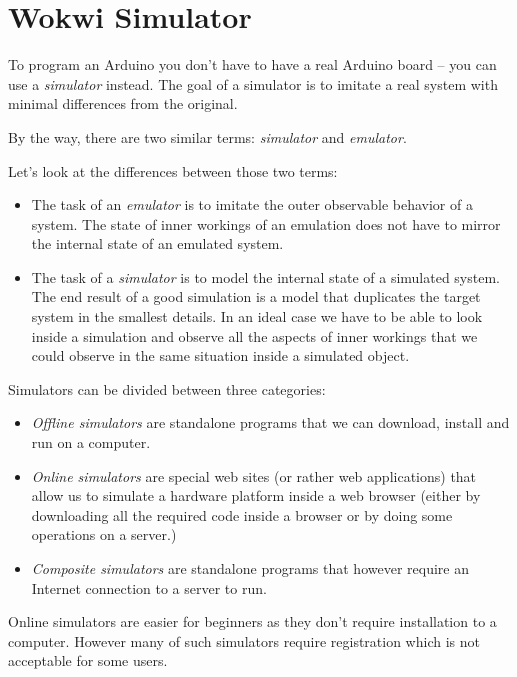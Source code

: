 \documentclass[../sparc.tex]{subfiles}
\begin{document}
\section{Wokwi Simulator}

To program an Arduino you don't have to have a real Arduino board -- you can use
a \emph{simulator} instead.  The goal of a simulator is to imitate a real system
with minimal differences from the original.

By the way, there are two similar terms: \emph{simulator} and \emph{emulator}.

Let's look at the differences\cite{so:simulator-vs-emulator} between those two
terms:

\begin{itemize}
\item The task of an \emph{emulator} is to imitate the outer observable behavior
  of a system.  The state of inner workings of an emulation does not have to
  mirror the internal state of an emulated system.
\item The task of a \emph{simulator} is to model the internal state of a
  simulated system.  The end result of a good simulation is a model that
  duplicates the target system in the smallest details.  In an ideal case we
  have to be able to look inside a simulation and observe all the aspects of
  inner workings that we could observe in the same situation inside a simulated
  object.
\end{itemize}

Simulators can be divided between three categories:
\begin{itemize}
\item \emph{Offline simulators} are standalone programs that we can download,
  install and run on a computer.
\item \emph{Online simulators} are special web sites (or rather web
  applications) that allow us to simulate a hardware platform inside a web
  browser (either by downloading all the required code inside a browser or by
  doing some operations on a server.)
\item \emph{Composite simulators} are standalone programs that however require
  an Internet connection to a server to run.
\end{itemize}

Online simulators are easier for beginners as they don't require installation to
a computer.  However many of such simulators require registration which is not
acceptable for some users.
\end{document}
